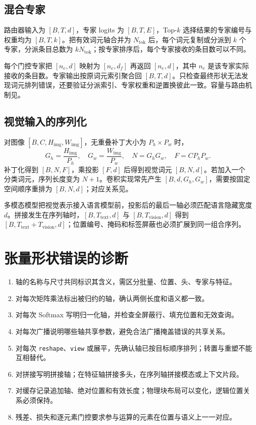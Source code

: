 \documentclass[../textbook.tex]{subfiles}
\begin{document}
\subsection{混合专家}

路由器输入为 $[B,T,d]$，专家 logits 为 $[B,T,E]$，Top-$k$ 选择结果的专家编号与权重均为 $[B,T,k]$。把有效词元轴合并为 $N_{\mathrm{tok}}$ 后，每个词元复制或分派到 $k$ 个专家，分派条目总数为 $kN_{\mathrm{tok}}$；按专家排序后，每个专家接收的条目数可以不同。

每个门控专家把 $[n_e,d]$ 映射为 $[n_e,d_f]$ 再返回 $[n_e,d]$，其中 $n_e$ 是该专家实际接收的条目数。专家输出按原词元索引聚合回 $[B,T,d]$。只检查最终形状无法发现词元排列错误，还要验证分派索引、专家权重和逆置换彼此一致。容量与路由机制见。

\subsection{视觉输入的序列化}

对图像 $[B,C,H_{\mathrm{img}},W_{\mathrm{img}}]$，无重叠补丁大小为 $P_h\times P_w$ 时，
\begin{equation}
 G_h=\frac{H_{\mathrm{img}}}{P_h},\quad
 G_w=\frac{W_{\mathrm{img}}}{P_w},\quad
 N=G_hG_w,\quad F=CP_hP_w.
\end{equation}
补丁化得到 $[B,N,F]$，乘投影 $[F,d]$ 后得到视觉词元 $[B,N,d]$。若加入一个分类词元，序列长度变为 $N+1$。卷积实现常先产生 $[B,d,G_h,G_w]$，需要按固定空间顺序重排为 $[B,N,d]$；对应关系见。

多模态模型把视觉表示接入语言模型前，投影后的最后一轴必须匹配语言隐藏宽度 $d$。拼接发生在序列轴时，$[B,T_{\mathrm{text}},d]$ 与 $[B,T_{\mathrm{vision}},d]$ 得到 $[B,T_{\mathrm{text}}+T_{\mathrm{vision}},d]$；位置编号、掩码和标签屏蔽也必须扩展到同一组合序列。

\section{张量形状错误的诊断}

\begin{enumerate}
 \item 轴的名称与尺寸共同标识其含义，需区分批量、位置、头、专家与特征。
 \item 对每次矩阵乘法标出被归约的轴，确认两侧长度和语义都一致。
 \item 对每次 Softmax 写明归一化轴，并检查全屏蔽行、填充位置和无效查询。
 \item 对每次广播说明哪些轴共享参数，避免合法广播掩盖错误的共享关系。
 \item 对每次 \texttt{reshape}、\texttt{view} 或展平，先确认轴已按目标顺序排列；转置与重塑不能互相替代。
 \item 对拼接写明拼接轴；在特征轴拼接多头，在序列轴拼接模态或上下文片段。
 \item 对缓存记录追加轴、绝对位置和有效长度；物理块布局可以变化，逻辑位置关系必须保持。
 \item 残差、损失和逐元素门控要求参与运算的元素在位置与语义上一一对应。
\end{enumerate}

\chapterreferences
\myendchapterdocument
\end{document}
